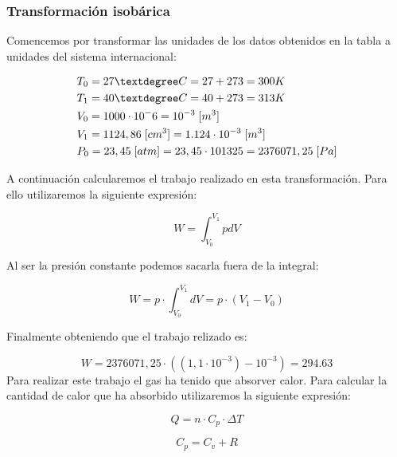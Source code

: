 \documentclass{article}
\begin{document}
\subsubsection{Transformación isobárica}

Comencemos por transformar las unidades de los datos obtenidos en la tabla a unidades del sistema internacional:

\begin{equation}
    \begin{split}
        & T_0 = 27 \textdegree C = 27 + 273 = 300 K  \\
        & T_1 = 40 \textdegree C = 40 + 273 = 313 K  \\
        & V_0 = 1000 \cdot 10^-6 = 10^{-3} \; [m^3]\\
        & V_1 = 1124,86 \; [cm^3] = 1.124 \cdot 10^{-3} \; [m^3] \\
        & P_0 = 23,45 \; [atm] = 23,45 \cdot 101325 = 2376071,25 \; [Pa] \\
    \end{split}
\end{equation}

A continuación calcularemos el trabajo realizado en esta transformación. Para ello utilizaremos la siguiente expresión:

\begin{equation}
    W = \int_{V_0}^{V_1} p dV
\end{equation}

Al ser la presión constante podemos sacarla fuera de la integral:

\begin{equation}
    W = p \cdot \int_{V_0}^{V_1} dV = p \cdot (V_1 - V_0)
\end{equation}

Finalmente obteniendo que el trabajo relizado es:

\begin{equation}
    W = 2376071,25\cdot ((1,1 \cdot 10^{-3}) - 10^{-3}) = 294.63
\end{equation}
Para realizar este trabajo el gas ha tenido que absorver calor. Para calcular la cantidad de calor que ha absorbido utilizaremos la siguiente expresión:

\begin{equation}
    Q = n \cdot C_p \cdot \Delta T
\end{equation}


\begin{equation}
    C_p = C_v + R
\end{equation}
\end{document}
